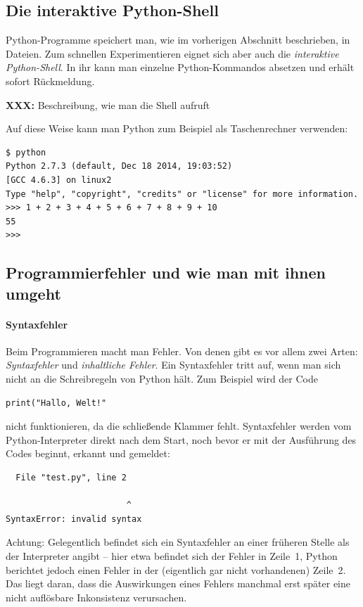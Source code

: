 \documentclass{blatt}
\newcommand{\XXX}[1]{\textbf{XXX:} #1}
\begin{document}
\subsection{Die interaktive Python-Shell}

Python-Programme speichert man, wie im vorherigen Abschnitt beschrieben, in
Dateien. Zum schnellen Experimentieren eignet sich aber auch die
\emph{interaktive Python-Shell}. In ihr kann man einzelne Python-Kommandos
absetzen und erhält sofort Rückmeldung.

\XXX{Beschreibung, wie man die Shell aufruft}

Auf diese Weise kann man Python zum Beispiel als Taschenrechner verwenden:
\begin{verbatim}
$ python
Python 2.7.3 (default, Dec 18 2014, 19:03:52)
[GCC 4.6.3] on linux2
Type "help", "copyright", "credits" or "license" for more information.
>>> 1 + 2 + 3 + 4 + 5 + 6 + 7 + 8 + 9 + 10
55
>>>
\end{verbatim}


\subsection{Programmierfehler und wie man mit ihnen umgeht}

\paragraph{Syntaxfehler}
Beim Programmieren macht man Fehler. Von denen gibt es vor allem zwei Arten:
\emph{Syntaxfehler} und \emph{inhaltliche Fehler}. Ein Syntaxfehler tritt auf,
wenn man sich nicht an die Schreibregeln von Python hält. Zum Beispiel wird der
Code
\begin{verbatim}
print("Hallo, Welt!"
\end{verbatim}
nicht funktionieren, da die schließende Klammer fehlt. Syntaxfehler werden vom
Python-In\-ter\-pre\-ter direkt nach dem Start, noch bevor er mit der Ausführung des
Codes beginnt, erkannt und gemeldet:
\begin{verbatim}
  File "test.py", line 2

                        ^
SyntaxError: invalid syntax
\end{verbatim}
Achtung: Gelegentlich befindet sich ein Syntaxfehler an einer früheren Stelle
als der Interpreter angibt -- hier etwa befindet sich der Fehler in Zeile~1,
Python berichtet jedoch einen Fehler in der (eigentlich gar nicht vorhandenen)
Zeile~2. Das liegt daran, dass die Auswirkungen eines
Fehlers manchmal erst später eine nicht auflösbare Inkonsistenz verursachen.
\end{document}
